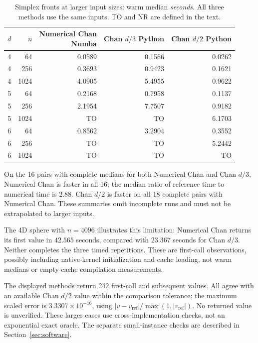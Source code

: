 \begin{table}[p]
\centering\small
\setlength{\tabcolsep}{5pt}
\begin{tabular}{rrrrr}
\toprule
$d$ & $n$ & \shortstack{Numerical Chan\\Numba} & \shortstack{Chan $d/3$\\Python} & \shortstack{Chan $d/2$\\Python} \\
\midrule
4 & 64 & 0.0589 & 0.1566 & 0.0262 \\
4 & 256 & 0.3693 & 0.9423 & 0.1621 \\
4 & 1024 & 4.0905 & 5.4955 & 0.9622 \\
5 & 64 & 0.2168 & 0.7958 & 0.1137 \\
5 & 256 & 2.1954 & 7.7507 & 0.9182 \\
5 & 1024 & TO & TO & 6.1703 \\
6 & 64 & 0.8562 & 3.2904 & 0.3552 \\
6 & 256 & TO & TO & 5.2442 \\
6 & 1024 & TO & TO & TO \\
\bottomrule
\end{tabular}
\caption{Simplex fronts at larger input sizes: warm median \emph{seconds}. All three methods use the same inputs. TO and NR are defined in the text.}
\label{tab:larger-simplex}
\end{table}

On the 16 pairs with complete medians for both Numerical Chan and Chan
$d/3$, Numerical Chan is faster in all 16; the median ratio of reference
time to numerical time is $2.88$. Chan $d/2$ is faster on all 18 complete
pairs with Numerical Chan. These summaries omit incomplete runs and
must not be extrapolated to larger inputs.

The 4D sphere with $n=4096$ illustrates this limitation: Numerical Chan
returns its first value in $42.565$ seconds, compared with $23.367$
seconds for Chan $d/3$. Neither completes the three timed repetitions.
These are first-call observations, possibly including native-kernel
initialization and cache loading, not warm medians or empty-cache
compilation measurements.

The displayed methods return 242 first-call and subsequent values.
All agree with an available Chan $d/2$ value within the comparison
tolerance; the maximum scaled error is $3.3307\times10^{-16}$, using
$|v-v_{\mathrm{ref}}|/\max(1,|v_{\mathrm{ref}}|)$. No returned value is
unverified. These larger cases use cross-implementation checks, not
an exponential exact oracle. The separate small-instance checks are
described in Section~\ref{sec:software}.

